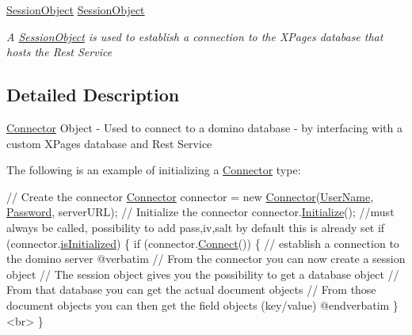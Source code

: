 \begin{DoxyCompactItemize}
\mbox{\hyperlink{class_session_object}{Session\+Object}} \mbox{\hyperlink{class_connector_a0a7bb42f9530796c086ab50785147ce9}{Session\+Object}}
\begin{DoxyCompactList}\small\item\em A \mbox{\hyperlink{class_session_object}{Session\+Object}} is used to establish a connection to the X\+Pages database that hosts the Rest Service \end{DoxyCompactList}\end{DoxyCompactItemize}


\subsection{Detailed Description}
\mbox{\hyperlink{class_connector}{Connector}} Object -\/ Used to connect to a domino database -\/ by interfacing with a custom X\+Pages database and Rest Service 

The following is an example of initializing a {\ttfamily \mbox{\hyperlink{class_connector}{Connector}}} type\+: 
\begin{DoxyCode}
    \textcolor{comment}{// Create the connector}
    \mbox{\hyperlink{class_connector}{Connector}} connector = \textcolor{keyword}{new} \mbox{\hyperlink{class_connector_a259c6d94252479cc3028038ebbaa7dc8}{Connector}}(\mbox{\hyperlink{class_connector_a41d247f09774f0ed206ce1a4a2463fed}{UserName}}, 
      \mbox{\hyperlink{class_connector_a7dd469898462ef761d256392766461fe}{Password}}, serverURL);
    \textcolor{comment}{// Initialize the connector}
    connector.\mbox{\hyperlink{class_connector_a2ceb19719cfc04adc4c2d299e19e1447}{Initialize}}();
    \textcolor{comment}{//must always be called, possibility to add pass,iv,salt by default this is already set}
    \textcolor{keywordflow}{if} (connector.\mbox{\hyperlink{class_connector_a017d40b1f4cf2cbaa5d4b755cf09269e}{isInitialized}}) \{
        \textcolor{keywordflow}{if} (connector.\mbox{\hyperlink{class_connector_a0dcf8f969c37c4306c567417a872329a}{Connect}}()) \{  \textcolor{comment}{// establish a connection to the domino server}
@verbatim
\textcolor{comment}{// From the connector you can now create a session object}
\textcolor{comment}{// The session object gives you the possibility to get a database object}
\textcolor{comment}{// From that database you can get the actual document objects}
\textcolor{comment}{// From those document objects you can then get the field objects (key/value)}
\textcolor{keyword}{@end}verbatim
        \}   
<br>    \}
\end{DoxyCode}
 

